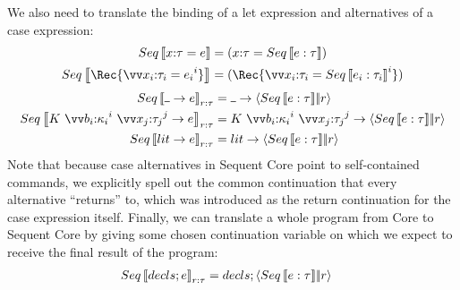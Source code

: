 \documentclass{article}
\begin{document}
We also need to translate the binding of a let expression and alternatives of a
case expression:
\begin{align*}
  Seq\trans{\ann x \ty = \expr}
  &=
  (\ann x \ty = Seq\trans{\expr : \ty})
  \\
  Seq\trans{\Rec \{ \vect[i]{\ann{x_i}{\ty_i} = \expr_i} \}}
  &=
  (\Rec \{ \vect[i]{\ann{x_i}{\ty_i} = Seq\trans{\expr_i : \ty_i}} \})
\end{align*}
\begin{align*}
  Seq\trans{\blank \to \expr}_{r:\ty}
  &=
  \blank \to \cut{Seq\trans{\expr : \ty}}{r}
  \\
  Seq\trans{
    K ~ \vect[i]{\ann{b_i}{\ki_i}} ~ \vect[j]{\ann{x_j}{\ty_j}} \to \expr
  }_{r:\ty}
  &=
  K ~ \vect[i]{\ann{b_i}{\ki_i}} ~ \vect[j]{\ann{x_j}{\ty_j}}
  \to
  \cut{Seq\trans{\expr : \ty}}{r}
  \\
  Seq\trans{\lit \to \expr}_{r:\ty}
  &=
  \lit \to \cut{Seq\trans{\expr : \ty}}{r}
\end{align*}
Note that because case alternatives in Sequent Core point to self-contained
commands, we explicitly spell out the common continuation that every alternative
``returns'' to, which was introduced as the return continuation for the case
expression itself.  Finally, we can translate a whole program from Core to
Sequent Core by giving some chosen continuation variable on which we expect to
receive the final result of the program:
\begin{align*}
  Seq\left\llbracket{decls; e}\right\rrbracket_{r:\tau} &= decls; \left\langle{Seq\left\llbracket{e:\tau}\right\rrbracket}\middle|\!\middle|{r}\right\rangle
\end{align*}
\end{document}
